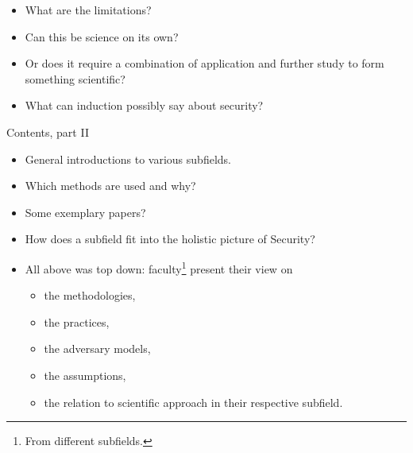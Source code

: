 \begin{frame}
  \begin{example}
    \begin{itemize}
      \item What are the limitations?
      \item Can this be science on its own?
      \item Or does it require a combination of application and further study 
        to form something scientific?
    \end{itemize}
  \end{example}

  \pause

  \begin{example}
    \begin{itemize}
      \item What can induction possibly say about security?
    \end{itemize}
  \end{example}
\end{frame}

\begin{frame}
  \begin{block}{Contents, part II}
    \begin{itemize}
      \item General introductions to various subfields.
      \item Which methods are used and why?
      \item Some exemplary papers?
      \item How does a subfield fit into the holistic picture of Security?
    \end{itemize}
  \end{block}
\end{frame}

\begin{frame}
  \begin{remark}
    \begin{itemize}
      \item All above was top down: faculty\footnote{%
          From different subfields.
        } present their view on
        \begin{itemize}
          \item the methodologies,
          \item the practices,
          \item the adversary models,
          \item the assumptions,
          \item the relation to scientific approach in their respective 
            subfield.
        \end{itemize}
    \end{itemize}
  \end{remark}
\end{frame}

